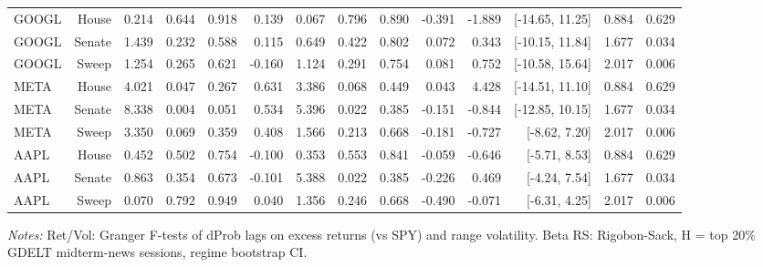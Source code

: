 \begin{table}[htbp]
\begin{tabular}{lrrrrrrrrrrrrr}
GOOGL & House & 0.214 & 0.644 & 0.918 & 0.139 & 0.067 & 0.796 & 0.890 & -0.391 & -1.889 & [-14.65, 11.25] & 0.884 & 0.629 \\
GOOGL & Senate & 1.439 & 0.232 & 0.588 & 0.115 & 0.649 & 0.422 & 0.802 & 0.072 & 0.343 & [-10.15, 11.84] & 1.677 & 0.034 \\
GOOGL & Sweep & 1.254 & 0.265 & 0.621 & -0.160 & 1.124 & 0.291 & 0.754 & 0.081 & 0.752 & [-10.58, 15.64] & 2.017 & 0.006 \\
META & House & 4.021 & 0.047 & 0.267 & 0.631 & 3.386 & 0.068 & 0.449 & 0.043 & 4.428 & [-14.51, 11.10] & 0.884 & 0.629 \\
META & Senate & 8.338 & 0.004 & 0.051 & 0.534 & 5.396 & 0.022 & 0.385 & -0.151 & -0.844 & [-12.85, 10.15] & 1.677 & 0.034 \\
META & Sweep & 3.350 & 0.069 & 0.359 & 0.408 & 1.566 & 0.213 & 0.668 & -0.181 & -0.727 & [-8.62, 7.20] & 2.017 & 0.006 \\
AAPL & House & 0.452 & 0.502 & 0.754 & -0.100 & 0.353 & 0.553 & 0.841 & -0.059 & -0.646 & [-5.71, 8.53] & 0.884 & 0.629 \\
AAPL & Senate & 0.863 & 0.354 & 0.673 & -0.101 & 5.388 & 0.022 & 0.385 & -0.226 & 0.469 & [-4.24, 7.54] & 1.677 & 0.034 \\
AAPL & Sweep & 0.070 & 0.792 & 0.949 & 0.040 & 1.356 & 0.246 & 0.668 & -0.490 & -0.071 & [-6.31, 4.25] & 2.017 & 0.006 \\
\bottomrule
\end{tabular}
\par\smallskip\footnotesize\emph{Notes:} Ret/Vol: Granger F-tests of dProb lags on excess returns (vs SPY) and range volatility. Beta RS: Rigobon-Sack, H = top 20\% GDELT midterm-news sessions, regime bootstrap CI.
\end{table}